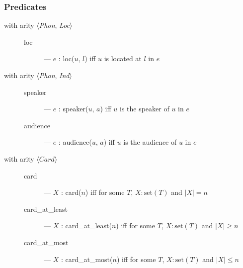   \subsubsection{Predicates} 

\begin{description}

 \item[with arity \textnormal{$\langle$\textit{Phon},
    \textit{Loc}$\rangle$}] \mbox{}
  
    \begin{description}

    \item[\textnormal{loc}] --- $e$ : loc($u$, $l$) iff $u$ is located
      at $l$ in $e$

    \end{description}
    
  \item[with arity \textnormal{$\langle$\textit{Phon},
      \textit{Ind}$\rangle$}] \mbox{}

    \begin{description}

    \item[\textnormal{speaker}] --- $e$ : speaker($u$, $a$) iff $u$
        is the speaker of $u$ in $e$

    \item[\textnormal{audience}] --- $e$ : audience($u$, $a$) iff
        $u$ is the audience of $u$ in $e$

      \end{description}

    \item[with arity \textnormal{$\langle\textit{Card}\rangle$}] \mbox{}

  \begin{description}
    
  \item[\textnormal{card}] --- $X$ : card($n$) iff for some $T$,
    $X:\mathrm{set}(T)$ and $|X|=n$
    
  \item[\textnormal{card\_at\_least}] --- $X$ : card\_at\_least($n$) iff for some $T$, $X:\mathrm{set}(T)$
    and $|X|\geq n$

    
  \item[\textnormal{card\_at\_most}] --- $X$ : card\_at\_most($n$) iff for some $T$, $X:\mathrm{set}(T)$
    and $|X|\leq n$

  \end{description}
      

\end{description}
